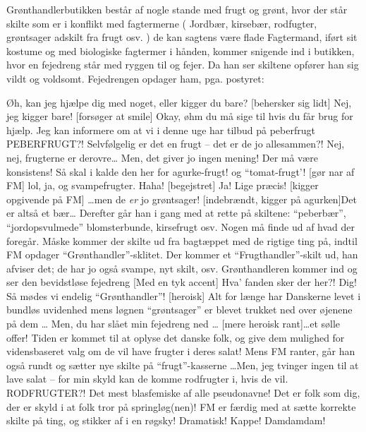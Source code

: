 \documentclass[a4paper,11pt]{article}
\begin{document}
\begin{sketch}

\scene Grønthandlerbutikken består af nogle stande med frugt og grønt, hvor der står skilte som er i konflikt med fagtermerne ( Jordbær, kirsebær, rodfugter, grøntsager adskilt fra frugt osv. ) de kan sagtens være flade
\scene Fagtermand, iført sit kostume og med biologiske fagtermer i hånden, kommer snigende ind i butikken, hvor en fejedreng står med ryggen til og fejer. Da han ser skiltene opfører han sig vildt og voldsomt. Fejedrengen opdager ham, pga. postyret:

 Øh, kan jeg hjælpe dig med noget, eller kigger du bare?
[behersker sig lidt] Nej, jeg kigger bare!
[forsøger at smile] Okay, øhm du må sige til hvis du får brug for hjælp. Jeg kan informere om at vi i denne uge har tilbud på peberfrugt
 PEBERFRUGT?! Selvfølgelig er det en frugt -- det er de jo allesammen?!
 Nej, nej, frugterne er derovre\ldots {} 
 Men, det giver jo ingen mening! Der må være konsistens! Så skal i kalde den her  for agurke-frugt!  og ``tomat-frugt'! 
[gør nar af FM] lol, ja, og svampefrugter. Haha!
[begejstret] Ja! Lige præcis!
[kigger opgivende på FM] \ldots men de \emph{er} jo grøntsager!
[indebrændt, kigger på agurken]Det er altså et bær\ldots
\scene Derefter går han i gang med at rette på skiltene: ``peberbær'', ``jordopsvulmede'' blomsterbunde, kirsefrugt osv. Nogen må finde ud af hvad der foregår. Måske kommer der skilte ud fra bagtæppet med de rigtige ting på, indtil FM opdager ``Grønthandler''-sklitet. Der kommer et ``Frugthandler''-skilt ud, han afviser det; de har jo også svampe, nyt skilt, osv.
\scene Grønthandleren kommer ind og ser den bevidstløse fejedreng
[Med en tyk accent] Hva' fanden sker der her?!
  Dig! Så mødes vi endelig  ``Grønthandler''!
[heroisk] Alt for længe har Danskerne levet i bundløs uvidenhed mens løgnen ``grøntsager'' er blevet trukket ned over øjenene på dem \ldots
{} Men, du har slået min fejedreng ned \ldots
{}[mere heroisk rant]\ldots et sølle offer! Tiden er kommet til at oplyse det danske folk, og give dem mulighed for vidensbaseret valg om de vil have frugter i deres salat!
\scene Mens FM ranter, går han også rundt og sætter nye skilte på ``frugt''-kasserne
 \ldots  Men, jeg tvinger ingen til at lave salat -- for min skyld kan de komme rodfrugter i, hvis de vil.
 RODFRUGTER?! Det mest blasfemiske af alle pseudonavne! Det er folk som dig, der er skyld i at folk tror på springløg(nen)! %
\scene FM er færdig med at sætte korrekte skilte på ting, og stikker af i en røgsky! Dramatisk! Kappe! Damdamdam!



\end{sketch}
\end{document}
